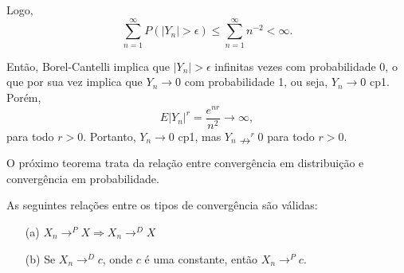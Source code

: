 \begin{frame}
\begin{block}{}
Logo,
$$\sum_{n=1}^{\infty}P(|Y_n|>\epsilon)\leq \sum_{n=1}^{\infty}n^{-2}<\infty.$$

Então, Borel-Cantelli implica que $|Y_n|>\epsilon$ infinitas vezes com probabilidade 0, o que por sua vez implica que
$Y_n\rightarrow 0$ com probabilidade 1, ou seja, $Y_n\rightarrow 0$ cp1. Porém,
$$E|Y_n|^r=\frac{e^{nr}}{n^2}\rightarrow \infty,$$
para todo $r>0$. Portanto, $Y_n\rightarrow 0$ cp1, mas $Y_n\nrightarrow^r 0$ para todo $r>0$.
\end{block}

O próximo teorema trata da relação entre convergência em
distribuição e convergência em probabilidade.

\begin{teo}
As seguintes relações entre os tipos de convergência são válidas:
\begin{enumerate}
\item[(a)] $X_n\rightarrow^P X\Rightarrow X_n\rightarrow^D X$

\item[(b)] Se $X_n\rightarrow^D c$, onde $c$ é uma constante, então $X_n\rightarrow^P c$.
\end{enumerate}
\end{teo}
%
\end{frame}
%
